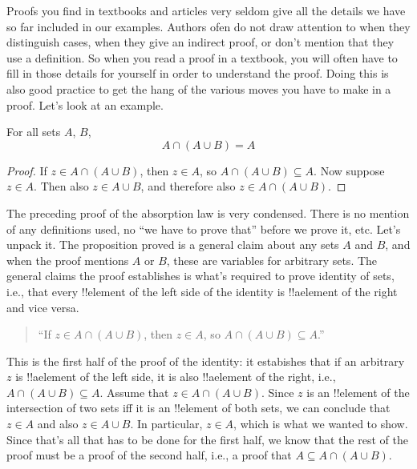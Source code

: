 \documentclass[../../../include/open-logic-section]{subfiles}
\begin{document}

Proofs you find in textbooks and articles very seldom give all the
details we have so far included in our examples. Authors ofen do not
draw attention to when they distinguish cases, when they give an
indirect proof, or don't mention that they use a definition.  So when
you read a proof in a textbook, you will often have to fill in those
details for yourself in order to understand the proof. Doing this is
also good practice to get the hang of the various moves you have to
make in a proof. Let's look at an example.

\begin{prop}[Absorption]
For all sets $A$, $B$,
\[
A \cap (A \cup B) = A
\]
\end{prop}

\begin{proof}
If $z \in A \cap (A \cup B)$, then $z \in A$, so $A \cap (A \cup B)
\subseteq A$. Now suppose $z \in A$. Then also $z \in A \cup B$, and
therefore also $z \in A \cap (A \cup B)$.
\end{proof}

The preceding proof of the absorption law is very condensed. There is
no mention of any definitions used, no ``we have to prove that''
before we prove it, etc. Let's unpack it.  The proposition proved is a
general claim about any sets $A$ and $B$, and when the proof mentions
$A$ or $B$, these are variables for arbitrary sets.  The general
claims the proof establishes is what's required to prove identity of
sets, i.e., that every !!{element} of the left side of the identity is
!!a{element} of the right and vice versa.  

\begin{quote}
``If $z \in A \cap (A \cup B)$, then $z \in A$, so $A \cap (A \cup B)
  \subseteq A$.''
\end{quote}

This is the first half of the proof of the identity: it estabishes
that if an arbitrary~$z$ is !!a{element} of the left side, it is also
!!a{element} of the right, i.e., $A \cap (A \cup B) \subseteq A$.
Assume that $z \in A \cap (A \cup B)$. Since $z$ is an !!{element} of
the intersection of two sets iff it is an !!{element} of both sets, we
can conclude that $z \in A$ and also $z \in A \cup B$. In particular,
$z \in A$, which is what we wanted to show.  Since that's all that has
to be done for the first half, we know that the rest of the proof must
be a proof of the second half, i.e., a proof that $A \subseteq A \cap
(A \cup B)$.
\end{document}
